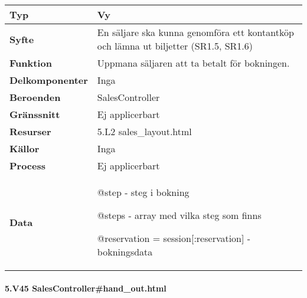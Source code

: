 \documentclass[a4paper, twoside, 11pt, titlepage]{article}
\begin{document}
			\begin {table} [ht] \begin{tabular} {  p{3.5cm} p{11.6cm} }
				\hline
				{\sffamily\textbf{Typ}} & {Vy} \\
				\hline
				{\sffamily\textbf{Syfte}} & {En säljare ska kunna genomföra ett kontantköp och lämna ut biljetter (SR1.5, SR1.6)} \\
				\hline
				{\sffamily\textbf{Funktion}} & {Uppmana säljaren att ta betalt för bokningen.} \\
				\hline
				{\sffamily\textbf{Delkomponenter}} & {Inga} \\
				\hline
				{\sffamily\textbf{Beroenden}} & {SalesController} \\
				\hline
				{\sffamily\textbf{Gränssnitt}} & {Ej applicerbart} \\
				\hline
				{\sffamily\textbf{Resurser}} & {5.L2 sales\_layout.html} \\
				\hline
				{\sffamily\textbf{Källor}} & {Inga} \\
				\hline
				{\sffamily\textbf{Process}} & {Ej applicerbart} \\
				\hline
				{\sffamily\textbf{Data}} & {@step - steg i bokning

@steps - array med vilka steg som finns

@reservation = session[:reservation] - bokningsdata} \\
				\hline
			\end{tabular} \end{table} \FloatBarrier


			\paragraph{5.V45 SalesController\#hand\_out.html}\
\end{document}
